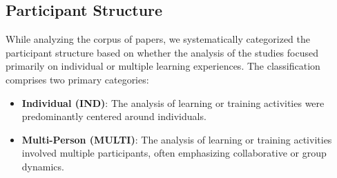 \documentclass[manuscript,screen,review]{acmart}
\begin{document}




\subsection{Participant Structure} \label{subsec:participant_structure}


While analyzing the corpus of papers, we systematically categorized the participant structure based on whether the analysis of the studies focused primarily on individual or multiple learning experiences. The classification comprises two primary categories: 
\begin{itemize}
    \item \textbf{Individual (IND)}: The analysis of learning or training activities were predominantly centered around individuals.
    \item \textbf{Multi-Person (MULTI)}: The analysis of learning or training activities involved multiple participants, often emphasizing collaborative or group dynamics. 
\end{itemize}
\end{document}
